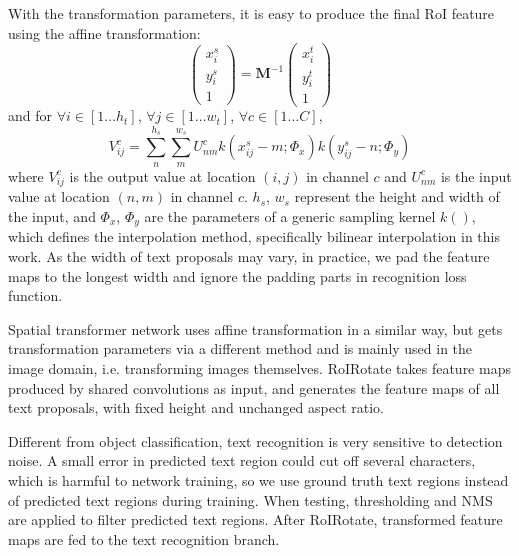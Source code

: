 \documentclass[10pt,twocolumn,letterpaper]{article}
\begin{document}
With the transformation parameters, it is easy to produce the final RoI feature using the affine transformation:
\begin{equation}
\begin{pmatrix}
x_i^s \\ y_i^s \\1
\end{pmatrix} = \mathbf{M}^{-1} \begin{pmatrix}
x_i^t \\ y_i^t \\1
\end{pmatrix}
\end{equation}
and for $\forall i \in [1\ldots h_t]$, $\forall j \in [1...w_t]$, $\forall c \in [1\ldots C]$,
\begin{equation}
V_{ij}^c = \sum_{n}^{h_s} \sum_{m}^{w_s} U_{nm}^{c} k(x_{ij}^s -m;\Phi_x) k(y_{ij}^s-n;\Phi_y)
\end{equation}
where $V_{ij}^c$ is the output value at location $(i, j)$ in channel $c$ and $U_{nm}^{c}$ is the input value at location $(n, m)$ in channel $c$. $h_s$, $w_s$ represent the height and width of the input, and $\Phi_x$, $\Phi_y$ are the parameters of a generic sampling kernel $k()$, which defines the interpolation method, specifically bilinear interpolation in this work. As the width of text proposals may vary, in practice, we pad the feature maps to the longest width and ignore the padding parts in recognition loss function.

Spatial transformer network \cite{jaderberg2015stn} uses affine transformation in a similar way, but gets transformation parameters via a different method and is mainly used in the image domain, i.e. transforming images themselves. RoIRotate takes feature maps produced by shared convolutions as input, and generates the feature maps of all text proposals, with fixed height and unchanged aspect ratio.

Different from object classification, text recognition is very sensitive to detection noise. A small error in predicted text region could cut off several characters, which is harmful to network training, so we use ground truth text regions instead of predicted text regions during training. When testing, thresholding and NMS are applied to filter predicted text regions. After RoIRotate, transformed feature maps are fed to the text recognition branch.
\end{document}
